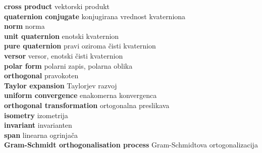 \documentclass[a4paper,12pt]{article}
\newcommand{\geslo}[2]{\noindent\textbf{#1} \quad \hangindent=1cm #2\\[-1pc]}
\begin{document}
\geslo{cross product}{vektorski produkt}

\geslo{quaternion conjugate}{konjugirana vrednost kvaterniona}

\geslo{norm}{norma}

\geslo{unit quaternion}{enotski kvaternion}

\geslo{pure quaternion}{pravi oziroma čisti kvaternion}

\geslo{versor}{versor, enotski čisti kvaternion}

\geslo{polar form}{polarni zapis, polarna oblika}

\geslo{orthogonal}{pravokoten}

\geslo{Taylor expansion}{Taylorjev razvoj}

\geslo{uniform convergence}{enakomerna konvergenca}

\geslo{orthogonal transformation}{ortogonalna preslikava}

\geslo{isometry}{izometrija}

\geslo{invariant}{invarianten}

\geslo{span}{linearna ogrinjača}

\geslo{Gram-Schmidt orthogonalisation process}{Gram-Schmidtova ortogonalizacija}




\end{document}
